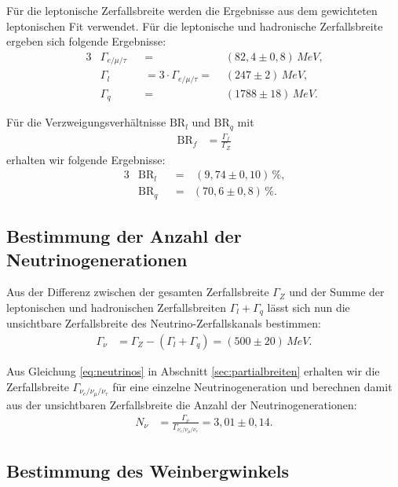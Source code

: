 Für die leptonische Zerfallsbreite werden die Ergebnisse aus dem gewichteten leptonischen Fit verwendet. Für die leptonische und hadronische Zerfallsbreite ergeben sich folgende Ergebnisse:
\begin{alignat}{3}
	&\Gamma_{e/\mu/\tau}&&=&(82,4\pm0,8)\,\si{MeV}\text{,}\\
	&\Gamma_l&&=3\cdot\Gamma_{e/\mu/\tau}=\,\,&(247\pm2)\,\si{MeV}\text{,}\\
	&\Gamma_q&&=&(1788\pm18)\,\si{MeV}\text{.}
\end{alignat}

Für die Verzweigungsverhältnisse $\mathrm{BR}_l$ und $\mathrm{BR}_q$ mit
\begin{align}
	\mathrm{BR}_f&=\frac{\Gamma_f}{\Gamma_Z}
\end{align}
erhalten wir folgende Ergebnisse:
\begin{alignat}{3}
	&\mathrm{BR}_l&&=&\,(9,74\pm0,10)\,\%\text{,}\\
	&\mathrm{BR}_q&&=&(70,6\pm0,8)\,\%\text{.}
\end{alignat}

\subsection{Bestimmung der Anzahl der Neutrinogenerationen}

Aus der Differenz zwischen der gesamten Zerfallsbreite $\Gamma_Z$ und der Summe der leptonischen und hadronischen Zerfallsbreiten $\Gamma_l+\Gamma_q$ lässt sich nun die unsichtbare Zerfallsbreite des Neutrino-Zerfallskanals bestimmen:
\begin{align}
	\Gamma_\nu&=\Gamma_Z-\left(\Gamma_l+\Gamma_q\right)=(500\pm20)\,\si{MeV}\text{.}
\end{align}

Aus Gleichung \ref{eq:neutrinos} in Abschnitt \ref{sec:partialbreiten} erhalten wir die Zerfallsbreite $\Gamma_{\nu_e/\nu_\mu/\nu_\tau}$ für eine einzelne Neutrinogeneration und berechnen damit aus der unsichtbaren Zerfallsbreite die Anzahl der Neutrinogenerationen:
\begin{align}
	N_\nu&=\frac{\Gamma_\nu}{\Gamma_{\nu_e/\nu_\mu/\nu_\tau}}=3,01\pm0,14\text{.}
\end{align}

\subsection{Bestimmung des Weinbergwinkels}

